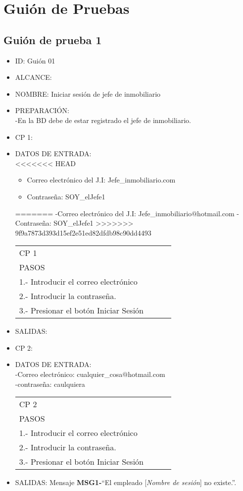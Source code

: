 \section{Guión de Pruebas}

\subsection{Guión de prueba 1}
\begin{itemize}
\item ID: Guión 01
\item ALCANCE: 
\item NOMBRE: Iniciar sesión de jefe de inmobiliario  
\item PREPARACIÓN:\\
-En la BD debe de estar registrado el jefe de inmobiliario.
\item CP 1:
\item DATOS DE ENTRADA:\\
<<<<<<< HEAD
	\begin{itemize}
		\item Correo electrónico del J.I: Jefe\_inmobiliario\@hotmail.com
		\item Contraseña: SOY\_elJefe1
	\end{itemize}
=======
	-Correo electrónico del J.I: Jefe\_inmobiliario$@$hotmail.com
	-Contraseña: SOY\_elJefe1
>>>>>>> 9f9a7873d393d15ef2e51ed82dfdb98c90dd4493
\begin{center}			
	\begin{tabular}{|l|l|l|l|}
		\hline
		CP 1\\
		PASOS\\
		\hline 1.- Introducir el correo electrónico\\
		\hline 2.- Introducir la contraseña.\\
		\hline 3.- Presionar el botón Iniciar Sesión\\
		\hline
	\end{tabular}
\end{center}
\item SALIDAS: \label{CU1LoginJI}
\item CP 2:
\item DATOS DE ENTRADA:\\
	-Correo electrónico: cualquier\_cosa$@$hotmail.com\\
	-contraseña: caulquiera
\begin{center}			
	\begin{tabular}{|l|l|l|l|}
		\hline
		CP 2\\
		PASOS\\
		\hline 1.- Introducir el correo electrónico\\
		\hline 2.- Introducir la contraseña.\\
		\hline 3.- Presionar el botón Iniciar Sesión\\
		\hline
	\end{tabular}
\end{center}
\item SALIDAS: Mensaje {\bf MSG1-}``El empleado [{\em Nombre de sesión}] no existe.''.
  

\end{itemize}
